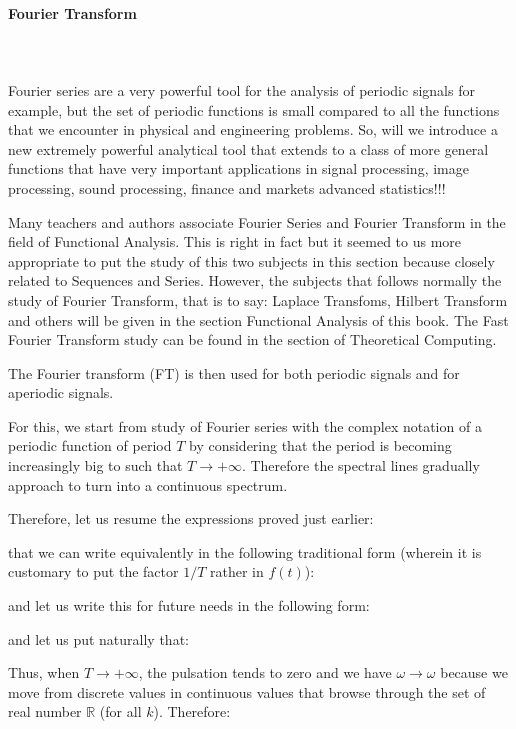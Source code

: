 	
	\pagebreak
	\paragraph{Fourier Transform}\label{fourier transform}\mbox{}\\\\
	Fourier series are a very powerful tool for the analysis of periodic signals for example, but the set of periodic functions is small compared to all the functions that we encounter in physical and engineering problems. So, will we introduce a new extremely powerful analytical tool that extends to a class of more general functions that have very important applications in signal processing, image processing, sound processing, finance and markets advanced statistics!!!
	
	\begin{tcolorbox}[title=Remark,colframe=black,arc=10pt]
	Many teachers and authors associate Fourier Series and Fourier Transform in the field of Functional Analysis. This is right in fact but it seemed to us more appropriate to put the study of this two subjects in this section because closely related to Sequences and Series. However, the subjects that follows normally the study of Fourier Transform, that is to say: Laplace Transfoms, Hilbert Transform and others will be given in the section Functional Analysis of this book. The Fast Fourier Transform study can be found in the section of Theoretical Computing.
	\end{tcolorbox}
	The Fourier transform (FT) is then used for both periodic signals and for aperiodic signals.
	
	For this, we start from study of Fourier series with the complex notation of a periodic function of period $T$ by considering that the period is becoming increasingly big to such that $T\rightarrow +\infty$. Therefore the spectral lines gradually approach to turn into a continuous spectrum.
	
	Therefore, let us resume the expressions proved just earlier:
	
	that we can write equivalently in the following traditional form (wherein it is customary to put the factor $1 / T$ rather in $f (t)$):
	
	and let us write this for future needs in the following form:
		
	and let us put naturally that:
	
	Thus, when $T\rightarrow +\infty$, the pulsation tends to zero and we have $\omega\rightarrow \omega$ because we move from discrete values in continuous values that browse through the set of real number $\mathbb{R}$ (for all $k$). Therefore:
	
